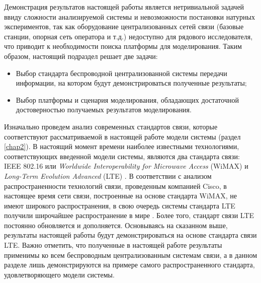 Демонстрация результатов настоящей работы является нетривиальной задачей ввиду сложности анализируемой системы и невозможности постановки натурных экспериментов, так как оборудование централизованных сетей связи (базовые станции, опорная сеть оператора и т.д.) недоступно для рядового исследователя, что приводит к необходимости поиска платформы для моделирования. Таким образом, настоящий подраздел решает две задачи:
\begin{itemize}
	\item Выбор стандарта беспроводной централизованной системы передачи информации, на котором будут демонстрироваться полученные результаты;
	\item Выбор платформы и сценария моделирования, обладающих достаточной достоверностью получаемых результатов моделирования.
\end{itemize}

Изначально проведем анализ современных стандартов связи, которые соответствуют рассматриваемой в настоящей работе модели системы (раздел \ref{chap2}). В настоящий момент времени наиболее известными технологиями, соответствующих введенной модели системы, являются два стандарта связи: IEEE 802.16 или \textit{Worldwide Interoperability for Microwave Access} (WiMAX) \cite{wimax_std} и \textit{Long-Term Evolution Advanced} (LTE) \cite{lte_std}. В соответствии с анализом распространенности технологий связи, проведенным компанией Cisco, в настоящее время сети связи, построенные на основе стандарта WiMAX, не имеют широкого распространения, в свою очередь системы стандарта LTE получили широчайшее распространение в мире \cite{Cisco}. Более того, стандарт связи LTE постоянно обновляется и дополняется. Основываясь на сказанном выше, результаты настоящей работы будут демонстрироваться на основе стандарта связи LTE. Важно отметить, что полученные в настоящей работе результаты применимы ко всем беспроводным централизованным системам связи, а в данном разделе лишь демонстрируются на примере самого распространенного стандарта, удовлетворяющего модели системы.

